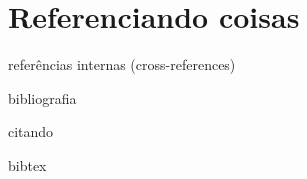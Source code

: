\section{Referenciando coisas}

referências internas (cross-references)

bibliografia

citando

bibtex
